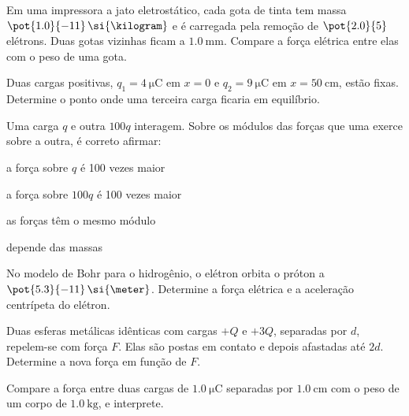 \begin{questao}[2]{}

Em uma impressora a jato eletrostático, cada gota de tinta tem massa
$\pot{1.0}{-11}\,\si{\kilogram}$ e é carregada pela remoção de
$\pot{2.0}{5}$ elétrons. Duas gotas vizinhas ficam a $\SI{1.0}{\milli\meter}$.
Compare a força elétrica entre elas com o peso de uma gota.


\end{questao}
\begin{questao}[2]{}

Duas cargas positivas, $q_1=\SI{4}{\micro\coulomb}$ em $x=0$ e
$q_2=\SI{9}{\micro\coulomb}$ em $x=\SI{50}{\centi\meter}$, estão fixas.
Determine o ponto onde uma terceira carga ficaria em equilíbrio.


\end{questao}
\begin{questao}[2]{}

Uma carga $q$ e outra $100q$ interagem. Sobre os módulos das forças que uma
exerce sobre a outra, é correto afirmar:
\begin{alternativas}[2]
\item a força sobre $q$ é 100 vezes maior
\item a força sobre $100q$ é 100 vezes maior
\item as forças têm o mesmo módulo
\item depende das massas
\end{alternativas}


\end{questao}
\begin{questao}[2]{}

No modelo de Bohr para o hidrogênio, o elétron orbita o próton a
$\pot{5.3}{-11}\,\si{\meter}$. Determine a força elétrica e a aceleração
centrípeta do elétron.


\end{questao}
\begin{questao}[2]{}

Duas esferas metálicas idênticas com cargas $+Q$ e $+3Q$, separadas por $d$,
repelem-se com força $F$. Elas são postas em contato e depois afastadas até
$2d$. Determine a nova força em função de $F$.


\end{questao}
\begin{questao}[2]{}

Compare a força entre duas cargas de $\SI{1.0}{\micro\coulomb}$ separadas por
$\SI{1.0}{\centi\meter}$ com o peso de um corpo de $\SI{1.0}{\kilogram}$, e
interprete.


\end{questao}

